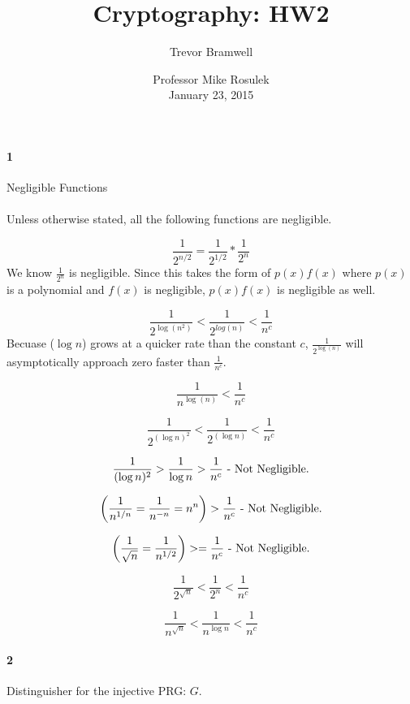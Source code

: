 \documentclass[12pt]{article}
\title{Cryptography: HW2}
\author{Trevor Bramwell}
\date{
    Professor Mike Rosulek\\
    January 23, 2015
}
\begin{document}
\maketitle


\paragraph{1} Negligible Functions
\\\\
Unless otherwise stated, all the following functions are negligible.

    \[
        \frac{1}{2^{n/2}} =  \frac{1}{2^{1/2}} * \frac{1}{2^{n}}
    \]
    We know $\frac{1}{2^{n}}$ is negligible. Since this takes the form
    of $p(x)f(x)$ where $p(x)$ is a polynomial and $f(x)$ is negligible,
    $p(x)f(x)$ is negligible as well.

    \[
        \frac{1}{2^{\log{(n^2)}}} < \frac{1}{2^{log(n)}} < \frac{1}{n^c}
    \]
    Becuase ($\log{n}$) grows at a quicker rate than the constant $c$,
    $\frac{1}{2^{\log{(n)}}}$ will asymptotically approach zero faster
    than $\frac{1}{n^c}$.

    \[
        \frac{1}{n^{\log{(n)}}} < \frac{1}{n^c}
    \]

    \[
        \frac{1}{2^{(\log{n})^2}} < \frac{1}{2^{(\log{n})}} < \frac{1}{n^c}
    \]


    \[
        \frac{1}{(\log{n})^2} > \frac{1}{\log{n}} > \frac{1}{n^c}
        \\
        \text{ - Not Negligible.}
    \]

    \[
        \left(\frac{1}{n^{1/n}} = \frac{1}{n^{-n}} = n^{n}\right) >
        \frac{1}{n^c}
        \\
        \text{ - Not Negligible.}
    \]

    \[
        \left(\frac{1}{\sqrt{n}} = \frac{1}{n^{1/2}}\right) >= \frac{1}{n^c}
        \\
        \text{ - Not Negligible.}
    \]

    \[
        \frac{1}{2^{\sqrt{n}}} < \frac{1}{2^n} < \frac{1}{n^c}
    \]

    \[
        \frac{1}{n^{\sqrt{n}}} < \frac{1}{n^{\log{n}}} < \frac{1}{n^c}
    \]

\paragraph{2} Distinguisher for the injective PRG: $G$.
\end{document}
